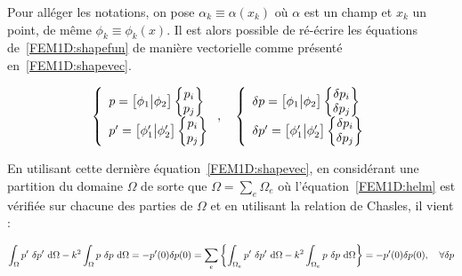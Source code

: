 Pour alléger les notations, on pose $\alpha_k\equiv \alpha(x_k)$ où $\alpha$ est un champ et $x_k$ un point, de même
$\phi_k\equiv\phi_k(x)$.
Il est alors possible de ré-écrire les équations de~\eqref{FEM1D:shapefun} de manière vectorielle comme présenté
en~\eqref{FEM1D:shapevec}.

\begin{equation}
	\left\{\begin{array}{l}
		p = \big[\phi_1\big|\phi_2\big]\begin{Bmatrix}p_i\\p_j\end{Bmatrix}\\
		p' = \big[\phi_1'\big|\phi_2'\big]\begin{Bmatrix}p_i\\p_j\end{Bmatrix}\\
	\end{array}\right.,\quad
	\left\{\begin{array}{l}
		\delta p = \big[\phi_1\big|\phi_2\big]\begin{Bmatrix}\delta p_i\\\delta p_j\end{Bmatrix}\\
		\delta p' = \big[\phi_1'\big|\phi_2'\big]\begin{Bmatrix}\delta p_i\\\delta p_j\end{Bmatrix}\\
	\end{array}\right.\label{FEM1D:shapevec}
\end{equation}

En utilisant cette dernière équation~\eqref{FEM1D:shapevec}, en considérant une partition du domaine $\Omega$ de sorte
que $\Omega = \sum_e\Omega_e$ où l'équation~\eqref{FEM1D:helm} est vérifiée sur chacune des parties de $\Omega$ et en
utilisant la relation de Chasles, il vient :

\begin{equation}
	\int_\Omega p'~\delta p'~\mathrm{d}\Omega - k^2\int_\Omega p~\delta p~\mathrm{d}\Omega = -p'(0)\delta p(0) = 
		\sum_e \left\{\int_{\Omega_e} p'~\delta p'~\mathrm{d}\Omega - k^2\int_{\Omega_e} p~\delta p~\mathrm{d}\Omega \right\}= -p'(0)\delta p(0), \quad \forall\delta p \label{FEM1D:IPP}
\end{equation}

